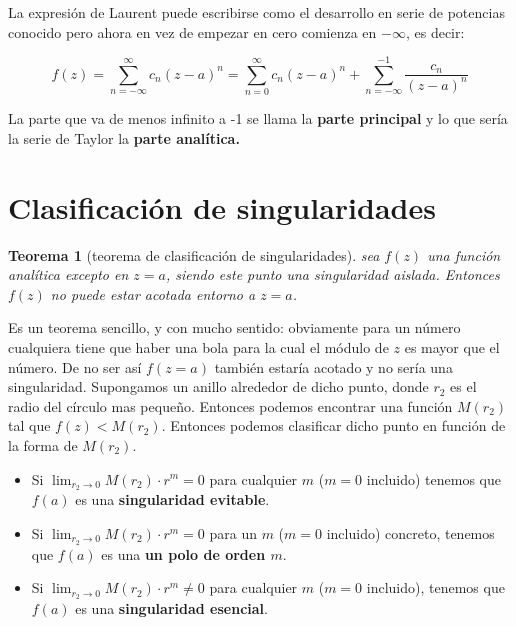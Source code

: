 \documentclass[12pt]{book}
\newtheorem{theorem}{Teorema}[section]
\begin{document}
La expresión de Laurent puede escribirse como el desarrollo en serie de potencias conocido pero ahora en vez de empezar en cero comienza en $-\infty$, es decir:

\begin{equation}
f(z) = \sum_{n=-\infty}^{\infty} c_n (z-a)^n = \sum_{n=0}^{\infty} c_n (z-a)^n + \sum_{n=-\infty}^{-1} \frac{c_{n}}{(z-a)^n}
\end{equation}

La parte que va de menos infinito a -1 se llama la \textbf{parte principal} y lo que sería la serie de Taylor la \textbf{parte analítica.}

\section{Clasificación de singularidades}

\begin{theorem}[teorema de clasificación de singularidades]
sea $f(z)$ una función analítica excepto en $z=a$, siendo este punto una singularidad aislada. Entonces $f(z)$ no puede estar acotada entorno a $z=a$. 
\end{theorem}

Es un teorema sencillo, y con mucho sentido: obviamente para un número cualquiera tiene que haber una bola para la cual el módulo de $z$ es mayor que el número. De no ser así $f(z=a)$ también estaría acotado y no sería una singularidad. Supongamos un anillo alrededor de dicho punto, donde $r_2$ es el radio del círculo mas pequeño. Entonces podemos encontrar una función $M(r_2)$ tal que $f(z) < M(r_2)$. Entonces podemos clasificar dicho punto en función de la forma de $M(r_2)$.

\begin{itemize}
\item Si $\lim_{r_2 \rightarrow 0} M(r_2) \cdot r^m  = 0$ para cualquier $m$ ($m=0$ incluido) tenemos que $f(a)$ es una \textbf{singularidad evitable}. 

\item Si $\lim_{r_2 \rightarrow 0} M(r_2) \cdot r^m  = 0$ para un $m$ ($m=0$ incluido) concreto, tenemos que $f(a)$ es una \textbf{un polo de orden $m$}.



\item Si $\lim_{r_2 \rightarrow 0} M(r_2) \cdot r^m  \neq 0$ para cualquier $m$ ($m=0$ incluido), tenemos que $f(a)$ es una \textbf{singularidad esencial}.
\end{itemize}
\end{document}
